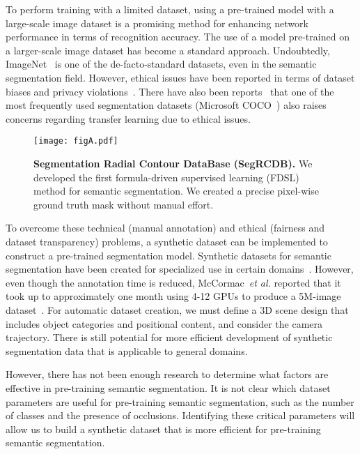 \documentclass[10pt,twocolumn,letterpaper]{article}
\begin{document}
To perform training with a limited dataset, using a pre-trained model with a large-scale image dataset is a promising method for enhancing network performance in terms of recognition accuracy. 
The use of a model pre-trained on a larger-scale image dataset has become a standard approach.
Undoubtedly, ImageNet~\cite{5206848} is one of the de-facto-standard datasets, even in the semantic segmentation field. However, ethical issues have been reported in terms of dataset biases and privacy violations~\cite{Prabhu2021LargeID,Yang_2020,yang2022faceobfuscation}. 
There have also been reports~\cite{zhao2021captionbias,wang2019iccv} that one of the most frequently used segmentation datasets (Microsoft COCO~\cite{https://doi.org/10.48550/arxiv.1405.0312}) also raises concerns regarding transfer learning due to ethical issues. 

\begin{figure}
\centering
\texttt{[image: figA.pdf]}
\caption{\textbf{Segmentation Radial Contour DataBase (SegRCDB).} We developed the first formula-driven supervised learning (FDSL) method for semantic segmentation. We created a precise pixel-wise ground truth mask without manual effort.}
\label{figA}
\vspace{-0pt}
\end{figure}

To overcome these technical (manual annotation) and ethical (fairness and dataset transparency) problems, a synthetic dataset can be implemented to construct a pre-trained segmentation model. Synthetic datasets for semantic segmentation have been created for specialized use in certain domains~\cite{Richter_2016_ECCV, Ros_2016_CVPR,8237554}. However, even though the annotation time is reduced, McCormac~\textit{et al.} reported that it took up to approximately one month using 4-12 GPUs to produce a 5M-image dataset~\cite{8237554}. For automatic dataset creation, we must define a 3D scene design that includes object categories and positional content, and consider the camera trajectory.
There is still potential for more efficient development of synthetic segmentation data that is applicable to general domains. 

However, there has not been enough research to determine what factors are effective in pre-training semantic segmentation.
It is not clear which dataset parameters are useful for pre-training semantic segmentation, such as the number of classes and the presence of occlusions.
Identifying these critical parameters will allow us to build a synthetic dataset that is more efficient for pre-training semantic segmentation.
\end{document}
